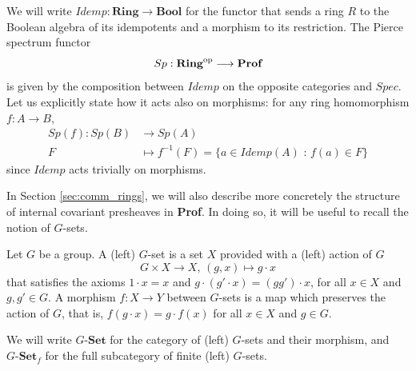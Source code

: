 \begin{definition}
\label{def:PierceSpectrum}
    We will write $Idemp:\textbf{Ring}\longrightarrow\textbf{Bool}$ for the functor that sends a ring $R$ to the Boolean algebra of its idempotents and a morphism to its restriction.
    The Pierce spectrum functor
    \[ Sp:{\textbf{Ring}}^{\mathrm{op}}\longrightarrow \textbf{Prof} \]
    is given by the composition between $Idemp$ on the opposite categories and $Spec$. Let us explicitly state how it acts also on morphisms: for any ring homomorphism $f:A\to B$,
    \begin{align*}
        Sp(f):Sp(B)&\longrightarrow  Sp(A)\\
        F&\longmapsto  f^{-1}(F)=\{a\in Idemp(A)\text{ : }f(a)\in F\}
    \end{align*}
    since $Idemp$ acts trivially on morphisms.
\end{definition}

In Section \ref{sec:comm_rings}, we will also describe more concretely the structure of internal covariant presheaves in \textbf{Prof}. In doing so, it will be useful to recall the notion of $G$-sets.
\begin{definition}
    Let $G$ be a group. A (left) $G$-set is a set $X$ provided with a (left) action of $G$
    \[ G\times X\longrightarrow X\text{, }(g,x)\mapsto g\cdot x \]
    that satisfies the axioms $1\cdot x=x$ and $g\cdot(g'\cdot x)=(gg')\cdot x$, for all $x\in X$ and $g,g'\in G$. A morphism $f:X\to Y$ between $G$-sets is a map which preserves the action of $G$, that is, $f(g\cdot x)=g\cdot f(x)$ for all $x\in X$ and $g\in G$.

    We will write $G\textbf{-Set}$ for the category of (left) $G$-sets and their morphism, and $G\textbf{-Set}_f$ for the full subcategory of finite (left) $G$-sets.
\end{definition}

